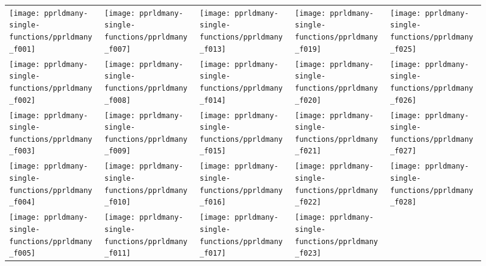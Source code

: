 \documentclass[sigconf]{acmart}
\begin{document}
{%
\begin{figure*}
\centering
\begin{tabular}{l@{\hspace*{-0.00\textwidth}}l@{\hspace*{0.01\textwidth}}l@{\hspace*{-0.00\textwidth}}l@{\hspace*{-0.00\textwidth}}l}
\texttt{[image: pprldmany-single-functions/pprldmany\_f001]}&
\texttt{[image: pprldmany-single-functions/pprldmany\_f007]}&
\texttt{[image: pprldmany-single-functions/pprldmany\_f013]}&
\texttt{[image: pprldmany-single-functions/pprldmany\_f019]}&
\texttt{[image: pprldmany-single-functions/pprldmany\_f025]}\\[-0.2em]
\texttt{[image: pprldmany-single-functions/pprldmany\_f002]}&
\texttt{[image: pprldmany-single-functions/pprldmany\_f008]}&
\texttt{[image: pprldmany-single-functions/pprldmany\_f014]}&
\texttt{[image: pprldmany-single-functions/pprldmany\_f020]}&
\texttt{[image: pprldmany-single-functions/pprldmany\_f026]}\\[-0.2em]
\texttt{[image: pprldmany-single-functions/pprldmany\_f003]}&
\texttt{[image: pprldmany-single-functions/pprldmany\_f009]}&
\texttt{[image: pprldmany-single-functions/pprldmany\_f015]}&
\texttt{[image: pprldmany-single-functions/pprldmany\_f021]}&
\texttt{[image: pprldmany-single-functions/pprldmany\_f027]}\\[-0.2em]
\texttt{[image: pprldmany-single-functions/pprldmany\_f004]}&
\texttt{[image: pprldmany-single-functions/pprldmany\_f010]}&
\texttt{[image: pprldmany-single-functions/pprldmany\_f016]}&
\texttt{[image: pprldmany-single-functions/pprldmany\_f022]}&
\texttt{[image: pprldmany-single-functions/pprldmany\_f028]}\\[-0.2em]
\texttt{[image: pprldmany-single-functions/pprldmany\_f005]}&
\texttt{[image: pprldmany-single-functions/pprldmany\_f011]}&
\texttt{[image: pprldmany-single-functions/pprldmany\_f017]}&
\texttt{[image: pprldmany-single-functions/pprldmany\_f023]}&

\end{tabular}
\end{figure*}}
\end{document}
